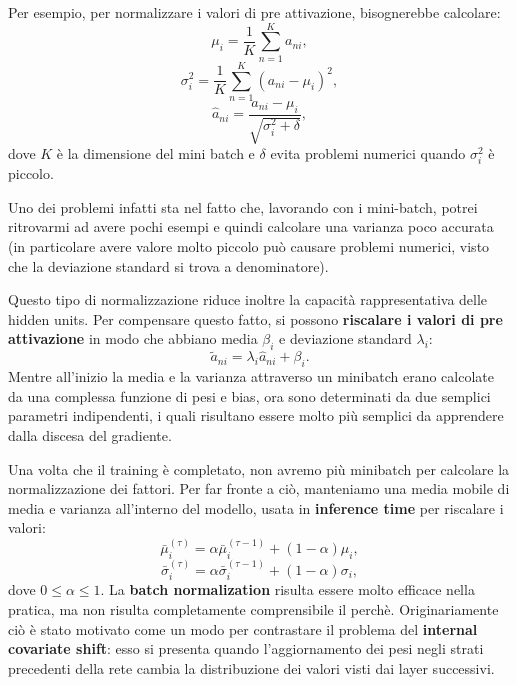 Per esempio, per normalizzare i valori di pre attivazione, bisognerebbe calcolare:
\begin{equation}
    \mu_i =\frac{1}{K}\sum^K_{n=1}a_{ni},
\end{equation}
\begin{equation}
    \sigma^2_i =\frac{1}{K}\sum^K_{n=1}(a_{ni}-\mu_i)^2,
\end{equation}
\begin{equation}
    \hat{a}_{ni}=\frac{a_{ni}-\mu_i}{\sqrt{\sigma^2_i+\delta}},
\end{equation}
dove $K$ è la dimensione del mini batch e $\delta$ evita problemi numerici quando $\sigma^2_i$ è piccolo.


Uno dei problemi infatti sta nel fatto che, lavorando con i mini-batch, potrei ritrovarmi ad avere pochi esempi e quindi calcolare una varianza poco accurata (in particolare avere valore molto piccolo può causare problemi numerici, visto che la deviazione standard si trova a denominatore).



Questo tipo di normalizzazione riduce inoltre la capacità rappresentativa delle hidden units. Per compensare questo fatto, si possono \textbf{riscalare i valori di pre attivazione} in modo che abbiano media $\beta_i$ e deviazione standard $\lambda_i$:
\begin{equation}
    \tilde{a}_{ni}=\lambda_i\hat{a}_{ni}+\beta_i.
\end{equation}
Mentre all'inizio la media e la varianza attraverso un minibatch erano calcolate da una complessa funzione di pesi e bias, ora sono determinati da due semplici parametri indipendenti, i quali risultano essere molto più semplici da apprendere dalla discesa del gradiente.



Una volta che il training è completato, non avremo più minibatch per calcolare la normalizzazione dei fattori. Per far fronte a ciò, manteniamo una media mobile di media e varianza all'interno del modello, usata in \textbf{inference time} per riscalare i valori:
\begin{equation}
    \bar{\mu}^{(\tau)}_i=\alpha\bar{\mu}^{(\tau-1)}_i+(1-\alpha)\mu_i,
\end{equation}
\begin{equation}
    \bar{\sigma}^{(\tau)}_i=\alpha\bar{\sigma}^{(\tau-1)}_i+(1-\alpha)\sigma_i,
\end{equation}
dove $0\leq\alpha\leq1$.
\newline
\newline
La \textbf{batch normalization} risulta essere molto efficace nella pratica, ma non risulta completamente comprensibile il perchè. Originariamente ciò è stato motivato come un modo per contrastare il problema del \textbf{internal covariate shift}: esso si presenta quando l'aggiornamento dei pesi negli strati precedenti della rete cambia la distribuzione dei valori visti dai layer successivi.


